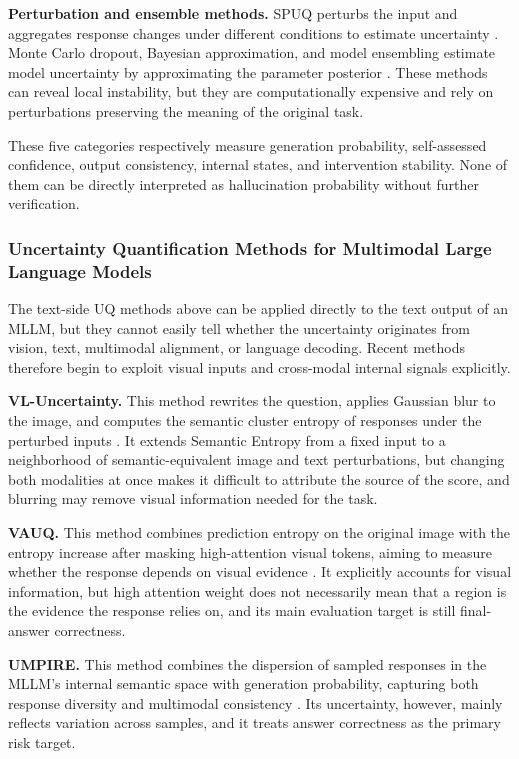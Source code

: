 \textbf{Perturbation and ensemble methods.} SPUQ perturbs the input and aggregates response changes under different conditions to estimate uncertainty \citep{gao2024spuq}. Monte Carlo dropout, Bayesian approximation, and model ensembling estimate model uncertainty by approximating the parameter posterior \citep{liu2025uncertainty}. These methods can reveal local instability, but they are computationally expensive and rely on perturbations preserving the meaning of the original task.

These five categories respectively measure generation probability, self-assessed confidence, output consistency, internal states, and intervention stability. None of them can be directly interpreted as hallucination probability without further verification.

\subsubsection{Uncertainty Quantification Methods for Multimodal Large Language Models}

The text-side UQ methods above can be applied directly to the text output of an MLLM, but they cannot easily tell whether the uncertainty originates from vision, text, multimodal alignment, or language decoding. Recent methods therefore begin to exploit visual inputs and cross-modal internal signals explicitly.

\textbf{VL-Uncertainty.} This method rewrites the question, applies Gaussian blur to the image, and computes the semantic cluster entropy of responses under the perturbed inputs \citep{zhang2024vluncertainty}. It extends Semantic Entropy from a fixed input to a neighborhood of semantic-equivalent image and text perturbations, but changing both modalities at once makes it difficult to attribute the source of the score, and blurring may remove visual information needed for the task.

\textbf{VAUQ.} This method combines prediction entropy on the original image with the entropy increase after masking high-attention visual tokens, aiming to measure whether the response depends on visual evidence \citep{park2026vauq}. It explicitly accounts for visual information, but high attention weight does not necessarily mean that a region is the evidence the response relies on, and its main evaluation target is still final-answer correctness.

\textbf{UMPIRE.} This method combines the dispersion of sampled responses in the MLLM's internal semantic space with generation probability, capturing both response diversity and multimodal consistency \citep{lau2026umpire}. Its uncertainty, however, mainly reflects variation across samples, and it treats answer correctness as the primary risk target.

